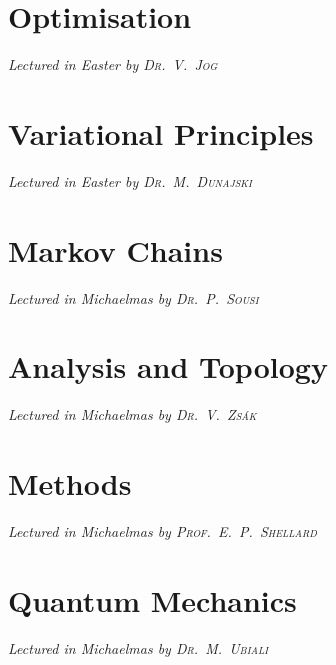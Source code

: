 \newcommand{\volname}{Part IB}


\chapter[Optimisation \\ \textnormal{\emph{Lectured in Easter \oldstylenums{2021} by \textsc{Dr.\ V.\ Jog}}}]{Optimisation}
\emph{\Large Lectured in Easter  by \textsc{Dr.\ V.\ Jog}}


\chapter[Variational Principles \\ \textnormal{\emph{Lectured in Easter \oldstylenums{2021} by \textsc{Dr.\ M.\ Dunajski}}}]{Variational Principles}
\emph{\Large Lectured in Easter  by \textsc{Dr.\ M.\ Dunajski}}


\chapter[Markov Chains \\ \textnormal{\emph{Lectured in Michaelmas \oldstylenums{2021} by \textsc{Dr.\ P.\ Sousi}}}]{Markov Chains}
\emph{\Large Lectured in Michaelmas  by \textsc{Dr.\ P.\ Sousi}}


\chapter[Analysis and Topology \\ \textnormal{\emph{Lectured in Michaelmas \oldstylenums{2021} by \textsc{Dr.\ V.\ Zs\'ak}}}]{Analysis and Topology}
\emph{\Large Lectured in Michaelmas  by \textsc{Dr.\ V.\ Zs\'ak}}


\chapter[Methods \\ \textnormal{\emph{Lectured in Michaelmas \oldstylenums{2021} by \textsc{Prof.\ E.\ P.\ Shellard}}}]{Methods}
\emph{\Large Lectured in Michaelmas  by \textsc{Prof.\ E.\ P.\ Shellard}}


\chapter[Quantum Mechanics \\ \textnormal{\emph{Lectured in Michaelmas \oldstylenums{2021} by \textsc{Dr.\ M.\ Ubiali}}}]{Quantum Mechanics}
\emph{\Large Lectured in Michaelmas  by \textsc{Dr.\ M.\ Ubiali}}


